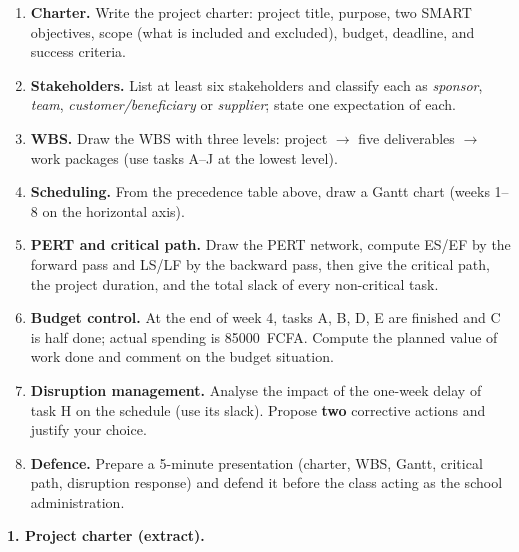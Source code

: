 \documentclass[11pt]{article}
\newcounter{popsec}
\newcounter{popsub}
\newcommand{\courssub}[1]{%
  \stepcounter{popsub}%
  \par\vspace{9pt}\noindent{\popxbold\fontsize{11.5}{13}\selectfont\color{popink}{\color{poporange}\thepopsec.\thepopsub}\hspace{6pt}#1}\par\nopagebreak\vspace{4pt}
}
\begin{document}
\begin{enumerate}
\item \textbf{Charter.} Write the project charter: project title, purpose, two SMART objectives, scope (what is included and excluded), budget, deadline, and success criteria.
\item \textbf{Stakeholders.} List at least six stakeholders and classify each as \emph{sponsor}, \emph{team}, \emph{customer/beneficiary} or \emph{supplier}; state one expectation of each.
\item \textbf{WBS.} Draw the WBS with three levels: project $\rightarrow$ five deliverables $\rightarrow$ work packages (use tasks A--J at the lowest level).
\item \textbf{Scheduling.} From the precedence table above, draw a Gantt chart (weeks 1--8 on the horizontal axis).
\item \textbf{PERT and critical path.} Draw the PERT network, compute ES/EF by the forward pass and LS/LF by the backward pass, then give the critical path, the project duration, and the total slack of every non-critical task.
\item \textbf{Budget control.} At the end of week 4, tasks A, B, D, E are finished and C is half done; actual spending is \SI{85000}{FCFA}. Compute the planned value of work done and comment on the budget situation.
\item \textbf{Disruption management.} Analyse the impact of the one-week delay of task H on the schedule (use its slack). Propose \textbf{two} corrective actions and justify your choice.
\item \textbf{Defence.} Prepare a 5-minute presentation (charter, WBS, Gantt, critical path, disruption response) and defend it before the class acting as the school administration.
\end{enumerate}

\courssub{Model answer}

\textbf{1. Project charter (extract).}
\end{document}
